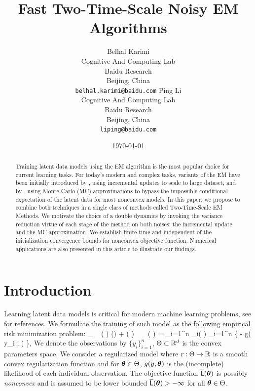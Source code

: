 \documentclass[11pt]{article}
\theoremstyle{t}
\begin{document}
\title{Fast Two-Time-Scale Noisy EM Algorithms}
\author{
  Belhal Karimi \\
  Cognitive And Computing Lab\\
  Baidu Research\\
  Beijing, China \\
  \texttt{belhal.karimi@baidu.com} 
   \And
  Ping Li \\
  Cognitive And Computing Lab\\
  Baidu Research\\
  Beijing, China \\
  \texttt{liping@baidu.com} }
\date{\today}

\maketitle

\begin{abstract}
Training latent data models using the EM algorithm is the most popular choice for current learning tasks. 
For today's modern and complex tasks, variants of the EM have been initially introduced by \citep{neal1998view}, using incremental updates to scale to large dataset, and by \citep{wei1990monte, delyon1999}, using Monte-Carlo (MC) approximations to bypass the impossible conditional expectation of the latent data for most nonconvex models.
In this paper, we propose to combine both techniques in a single class of methods called Two-Time-Scale EM Methods. 
We motivate the choice of a double dynamics by invoking the variance reduction virtue of each stage of the method on both noises: the incremental update and the MC approximation.
We establish finite-time and independent of the initialization convergence bounds for nonconvex objective function.
Numerical applications are also presented in this article to illustrate our findings.
\end{abstract}


\section{Introduction}
Learning latent data models is critical for modern machine learning problems, see \citep{mclachlan2007algorithm} for references.
We formulate the training of such model as the following empirical risk minimization problem:
\beq \label{eq:em_motivate}
\min_{ \param \in \Param }~ \overline{\calL} ( \param ) \eqdef \Pen (\param) + \calL ( \param )~~~~\calL ( \param ) =  \sum_{i=1}^n \calL_i( \param) \eqdef  {} \sum_{i=1}^n \big\{ - \log g( y_i ; \param ) \big\}\eqs,
\eeq
We denote the observations by $\{y_i\}_{i=1}^n$, $\Theta \subset \mathbb{R}^d$ is the convex parameters space.
We consider a regularized model where $\operatorname{r} : \Theta \rightarrow \mathbb{R}$ is a smooth convex regularization function and for ${\bm{\theta}} \in \Theta$, $g(y;{\bm{\theta}})$ is the (incomplete) likelihood of each individual  observation.
The objective function $ \overline{{\textsf{L}}} ( {\bm{\theta}} )$ is possibly \emph{nonconvex} and is assumed to be lower bounded $ \overline{{\textsf{L}}} ( {\bm{\theta}} ) > - \infty$ for all ${\bm{\theta}} \in \Theta$.
\end{document}
